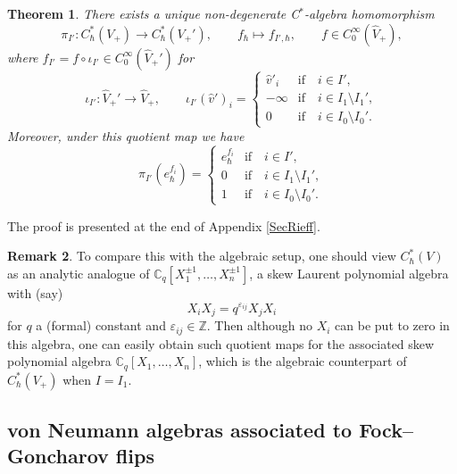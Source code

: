 \documentclass[11pt, reqno]{amsart}
\newtheorem{theorem}{Theorem}[section]
\theoremstyle{definition}
\newtheorem{remark}[theorem]{Remark}
\numberwithin{equation}{section}
\def\C{\mathbb C}
\def\Z{\mathbb Z}
\begin{document}
\begin{theorem}\label{TheoDegRep}
There exists a unique non-degenerate C$^*$-algebra homomorphism 
\begin{equation}\label{EqRepDegBound}
\pi_{I'}\colon  C_{\hbar}^*(V_+) \rightarrow C_{\hbar}^*(V_+'),\qquad  f_{\hbar} \mapsto f_{I',\hbar}, \qquad f \in C_0^{\infty}(\hat{V}_+),
\end{equation}
where $f_{I'} =  f\circ \iota_{I'} \in C_0^{\infty}(\hat{V}_+')$ for
\begin{equation}\label{EqDegMap}
\iota_{I'}\colon  \hat{V}_+' \rightarrow \hat{V}_+,\qquad \iota_{I'}(\hat{v}')_i = \begin{cases}\hat{v}'_i &\text{if} \quad i\in I', \\
-\infty &\text{if} \quad i\in I_1\setminus I_1',\\
0 &\text{if} \quad i\in I_0\setminus I_0'.
\end{cases}
\end{equation}
Moreover, under this quotient map we have  
\begin{equation}\label{EqImageDegMap}
\pi_{I'}(e_{\hbar}^{f_i}) =  \begin{cases}e_{\hbar}^{f_i} &\text{if} \quad i\in I', \\
0 &\text{if} \quad i\in I_1\setminus I_1',\\
1 &\text{if} \quad i\in I_0\setminus I_0'.
\end{cases}
\end{equation}
\end{theorem}

The proof is presented at the end of Appendix \ref{SecRieff}.

\begin{remark}
To compare this with the algebraic setup, one should view $C^*_{\hbar}(V)$ as an analytic analogue of $\C_q[X_1^{\pm1},\ldots,X_n^{\pm1}]$, a skew Laurent polynomial algebra with (say)
\[
X_i X_j = q^{\varepsilon_{ij}}X_jX_i
\]
for $q$ a (formal) constant and $\varepsilon_{ij}\in \Z$. Then although no $X_i$ can be put to zero in this algebra, one can easily obtain such quotient maps for the associated skew polynomial algebra $\C_q[X_1,\ldots,X_n]$, which is the algebraic counterpart of $C_{\hbar}^*(V_+)$ when $I= I_1$. 
\end{remark}


\subsection{von Neumann algebras associated to Fock--Goncharov flips}\label{SecProofvNFGflip}
\end{document}

